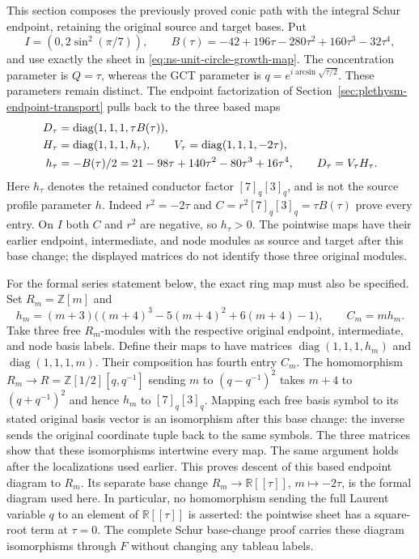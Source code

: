 This section composes the previously proved conic path with the integral
Schur endpoint, retaining the original source and target bases. Put
\[
 I=(0,2\sin^2(\pi/7)),\qquad
 B(\tau)=-42+196\tau-280\tau^2+160\tau^3-32\tau^4,
\]
and use exactly the sheet in \eqref{eq:ns-unit-circle-growth-map}.
The concentration parameter is $Q=\tau$, whereas the GCT parameter is
$q=e^{i\arcsin\sqrt{\tau/2}}$. These parameters remain distinct.
The endpoint factorization of Section~\ref{sec:plethysm-endpoint-transport}
pulls back to the three based maps
\begin{align}
 D_\tau&=\operatorname{diag}(1,1,1,\tau B(\tau)),\notag\\
 H_\tau&=\operatorname{diag}(1,1,1,h_\tau),\qquad
 V_\tau=\operatorname{diag}(1,1,1,-2\tau),\notag\\
 h_\tau&=-B(\tau)/2
 =21-98\tau+140\tau^2-80\tau^3+16\tau^4,\qquad
 D_\tau=V_\tau H_\tau.\label{eq:ns-schur-original-factorization}
\end{align}
Here $h_\tau$ denotes the retained conductor factor $[7]_q[3]_q$,
and is not the source profile parameter $h$. Indeed $r^2=-2\tau$
and $C=r^2[7]_q[3]_q=\tau B(\tau)$ prove every entry.
On $I$ both $C$ and $r^2$ are negative, so $h_\tau>0$.
The pointwise maps have their earlier endpoint, intermediate, and node modules
as source and target after this base change; the displayed matrices
do not identify those three original modules.

For the formal series statement below, the exact ring map must also be
specified. Set $R_m=\mathbb Z[m]$ and
\[
 h_m=(m+3)\bigl((m+4)^3-5(m+4)^2+6(m+4)-1\bigr),
 \qquad C_m=mh_m.
\]
Take three free $R_m$-modules with the respective original endpoint,
intermediate, and node basis labels. Define their maps to have matrices
$\operatorname{diag}(1,1,1,h_m)$ and
$\operatorname{diag}(1,1,1,m)$. Their composition has fourth entry
$C_m$. The homomorphism $R_m\to R=\mathbb Z[1/2][q,q^{-1}]$ sending
$m$ to $(q-q^{-1})^2$ takes $m+4$ to $(q+q^{-1})^2$ and hence
$h_m$ to $[7]_q[3]_q$. Mapping each free basis symbol to its stated
original basis vector is an isomorphism after this base change: the
inverse sends the original coordinate tuple back to the same symbols.
The three matrices show that these isomorphisms intertwine every map.
The same argument holds after the localizations used earlier.
This proves descent of this based endpoint diagram to $R_m$.
Its separate base change $R_m\to\mathbb R[[\tau]]$, $m\mapsto-2\tau$,
is the formal diagram used here. In particular, no homomorphism sending
the full Laurent variable $q$ to an element of $\mathbb R[[\tau]]$ is
asserted: the pointwise sheet has a square-root term at $\tau=0$.
The complete Schur base-change proof carries these diagram
isomorphisms through $F$ without changing any tableau labels.

